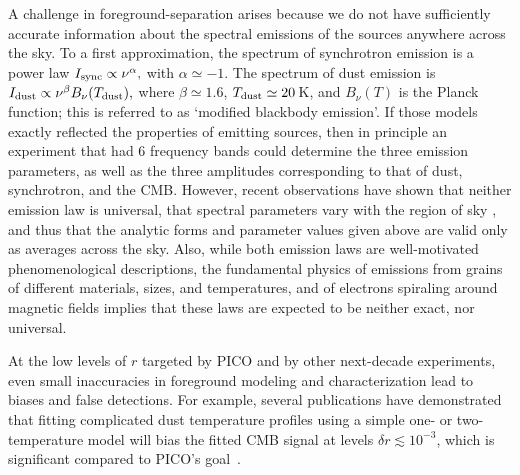 \documentclass[PICOReport.tex]{subfiles}
\begin{document}
A challenge in foreground-separation arises because we do not have sufficiently accurate information about the spectral emissions of the sources anywhere across the sky. 
To a first approximation, the spectrum of synchrotron emission is a power law $I_{\rm sync} \propto \nu^{\alpha},$ with $\alpha \simeq -1$.  The spectrum of dust emission is $I_{\rm dust} \propto \nu^{\beta} B_\nu(T_{\rm dust}),$ where $\beta \simeq 1.6$, $T_{\rm dust} \simeq 20$\,K, and $B_\nu(T)$ is the Planck function; this is referred to as `modified blackbody emission'. If those models exactly reflected the properties of emitting sources, then in principle an experiment that had 6 frequency bands could determine the three emission parameters, as well as the three amplitudes corresponding to that of dust, synchrotron, and the CMB. However, recent observations have shown that neither emission law is universal, that spectral parameters vary with the region of sky \cite{SPASS_2018_variation,fuskeland2014_wmap_variation,planck_2013_xi}, and thus that the analytic forms and parameter values given above are valid only as averages across the sky. Also, while both emission laws are well-motivated phenomenological descriptions, the fundamental physics of emissions from grains of different materials, sizes, and temperatures, and of electrons spiraling around magnetic fields implies that these laws are expected to be neither exact, nor universal. 

At the low levels of $r$ targeted by PICO and by other next-decade experiments, even small inaccuracies in foreground modeling and characterization lead to biases and false detections. For example, several publications have demonstrated that fitting complicated dust temperature profiles using a simple one- or two-temperature model will bias the fitted CMB signal at levels $\delta r \lesssim 10^{-3}$, which is significant compared to PICO's goal~\citep{fantaye2011,armitage-caplan2012,kogut_fixsen2016,remazeilles/etal:2016,stompor2016}. 


\end{document}
